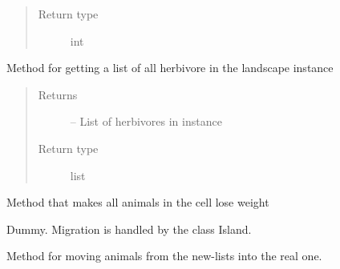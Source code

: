 \documentclass[a4paper,10pt,english]{sphinxmanual}
\begin{document}
\begin{fulllineitems}
\begin{fulllineitems}
\begin{quote}
\begin{description}
\item[{Return type}] \leavevmode
int

\end{description}\end{quote}

\end{fulllineitems}


\begin{fulllineitems}
\label{\detokenize{landscape:biosim.landscape.Jungle.get_herbivores}}
Method for getting a list of all herbivore in the landscape instance
\begin{quote}\begin{description}
\item[{Returns}] \leavevmode
{} -- List of herbivores in instance

\item[{Return type}] \leavevmode
list

\end{description}\end{quote}

\end{fulllineitems}


\begin{fulllineitems}
\label{\detokenize{landscape:biosim.landscape.Jungle.loss_of_weight}}
Method that makes all animals in the cell lose weight

\end{fulllineitems}


\begin{fulllineitems}
\label{\detokenize{landscape:biosim.landscape.Jungle.migration}}
Dummy. Migration is handled by the class Island.

\end{fulllineitems}


\begin{fulllineitems}
\label{\detokenize{landscape:biosim.landscape.Jungle.move_new_animals}}
Method for moving animals from the new-lists into the real one.


\end{fulllineitems}
\end{fulllineitems}
\end{document}
